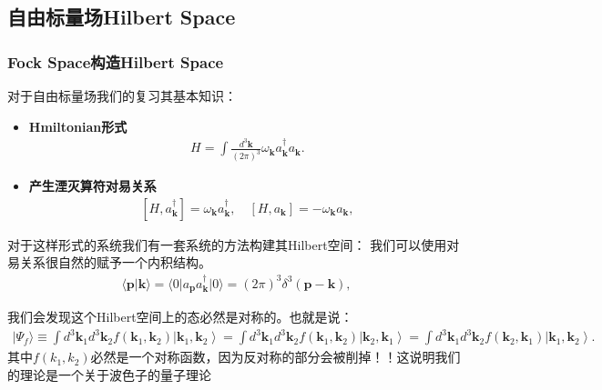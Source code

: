 \subsection{自由标量场Hilbert Space}
\subsubsection{Fock Space构造Hilbert Space}

\bigskip
{}

对于自由标量场我们的复习其基本知识：
\begin{itemize}
  \item \textbf{Hmiltonian形式}
    \begin{align}
      H=\int\frac{d^3\mathbf{k}}{(2\pi)^3}\omega_\mathbf{k}a_\mathbf{k}^\dagger
      a_\mathbf{k}.
    \end{align}
  \item \textbf{产生湮灭算符对易关系}
    \begin{align}
      \left[H,a_\mathbf{k}^\dagger\right]=\omega_\mathbf{k}a_\mathbf{k}^\dagger,\quad[H,a_\mathbf{k}]=-\omega_\mathbf{k}a_\mathbf{k},
    \end{align}
\end{itemize}
对于这样形式的系统我们有一套系统的方法构建其Hilbert空间：
我们可以使用对易关系很自然的赋予一个内积结构。
\begin{align}
  \langle\mathbf{p}|\mathbf{k}\rangle=\langle0|a_\mathbf{p}a_\mathbf{k}^\dagger|0\rangle=(2\pi)^3\delta^3(\mathbf{p-k}),
\end{align}

\bigskip
{}

我们会发现这个Hilbert空间上的态必然是对称的。也就是说：
\begin{align}
  |\Psi_f\rangle\equiv\int
  d^3\mathbf{k}_1d^3\mathbf{k}_2\left.f(\mathbf{k}_1,\mathbf{k}_2)|\mathbf{k}_1,\mathbf{k}_2\right\rangle=\int
  d^3\mathbf{k}_1d^3\mathbf{k}_2\left.f(\mathbf{k}_1,\mathbf{k}_2)|\mathbf{k}_2,\mathbf{k}_1\right\rangle=\int
  d^3\mathbf{k}_1d^3\mathbf{k}_2\left.f(\mathbf{k}_2,\mathbf{k}_1)|\mathbf{k}_1,\mathbf{k}_2\right\rangle.
\end{align}
其中$ f(k_1,k_2) $必然是一个对称函数，因为反对称的部分会被削掉！！这说明我们的理论是一个关于波色子的量子理论

